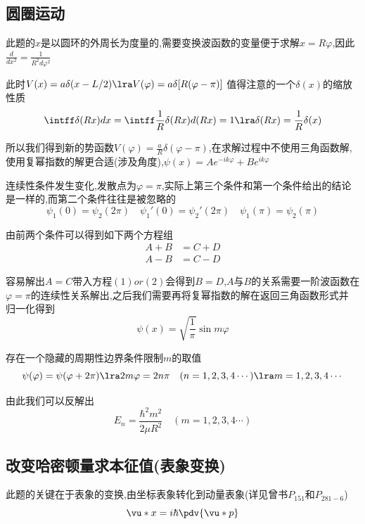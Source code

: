         \subsection{圆圈运动}

        此题的$x$是以圆环的外周长为度量的,需要变换波函数的变量便于求解$x=R\varphi$,因此$\frac{d}{dx^{2}}=\frac{1}{R^{2}d\varphi^{2}}$

        此时$V(x)=a\delta(x-L/2) \lra V(\varphi) = a \delta[R(\varphi-\pi)]$
        值得注意的一个$\delta(x)$的缩放性质
            $$ \intff \delta(Rx)dx = \intff \frac{1}{R} \delta(Rx) d(Rx) = 1 \lra \delta(Rx) = \frac{1}{R}\delta(x)$$

        所以我们得到新的势函数$V(\varphi) = \frac{a}{R} \delta(\varphi-\pi) $,在求解过程中不使用三角函数解,使用复幂指数的解更合适(涉及角度),\quad $\psi(x) = Ae^{-ik\varphi} + Be^{ik\varphi}$

        连续性条件发生变化,发散点为$\varphi = \pi$,实际上第三个条件和第一个条件给出的结论是一样的,而第二个条件往往是被忽略的
        $$ \psi_{1}(0) = \psi_{2}(2\pi) \quad \psi_{1}'(0) = \psi_{2}'(2\pi)\quad \psi_{1}(\pi) = \psi_{2}(\pi) $$
        
        由前两个条件可以得到如下两个方程组
        \begin{align}
            A+B&=C+D\\
            A-B&=C-D
        \end{align}

        容易解出$A=C$带入方程$(1)or(2)$会得到$B=D$,$A$与$B$的关系需要一阶波函数在$\varphi=\pi$的连续性关系解出,之后我们需要再将复幂指数的解在返回三角函数形式并
        归一化得到
        $$ \psi(x) = \sqrt{\frac{1}{\pi}} \sin{m \varphi} $$
        
        存在一个隐藏的周期性边界条件限制$m$的取值
        $$ \psi(\varphi) = \psi(\varphi+2\pi) \lra 2m\varphi = 2n\pi \quad (n=1,2,3,4\cdots) \lra m = 1,2,3,4\cdots $$
        
        由此我们可以反解出
        $$ E_{n} = \frac{\hbar^{2} m^{2}}{2\mu R^{2}} \quad (m=1,2,3,4\cdots)$$

        \subsection{改变哈密顿量求本征值(表象变换)}
            此题的关键在于表象的变换,由坐标表象转化到动量表象(详见曾书$P_{151}$和$P_{281-6}$)
            $$ \vu*{x} = i\hbar \pdv{\vu*{p}}$$

